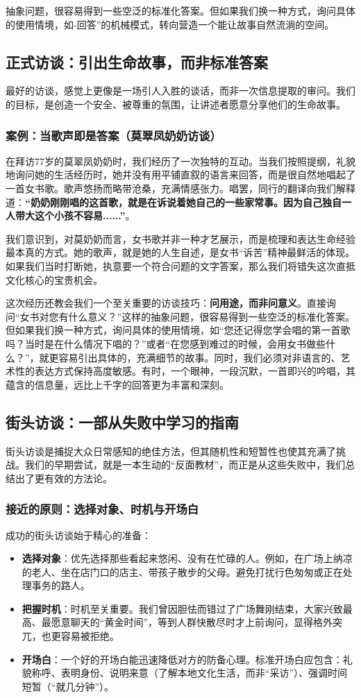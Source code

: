 \documentclass[UTF8]{ctexart}
\begin{document}
抽象问题，很容易得到一些空泛的标准化答案。但如果我们换一种方式，询问具体的使用情境，如-回答”的机械模式，转向营造一个能让故事自然流淌的空间。

\subsection{正式访谈：引出生命故事，而非标准答案}
最好的访谈，感觉上更像是一场引人入胜的谈话，而非一次信息提取的审问。我们的目标，是创造一个安全、被尊重的氛围，让讲述者愿意分享他们的生命故事。

\subsubsection{案例：当歌声即是答案（莫翠凤奶奶访谈）}
在拜访77岁的莫翠凤奶奶时，我们经历了一次独特的互动。当我们按照提纲，礼貌地询问她的生活经历时，她并没有用平铺直叙的语言来回答，而是很自然地唱起了一首女书歌。歌声悠扬而略带沧桑，充满情感张力。唱罢，同行的翻译向我们解释道：\textbf{“奶奶刚刚唱的这首歌，就是在诉说着她自己的一些家常事。因为自己独自一人带大这个小孩不容易......”}。

我们意识到，对莫奶奶而言，女书歌并非一种才艺展示，而是梳理和表达生命经验最本真的方式。她的歌声，就是她的人生自述，是女书“诉苦”精神最鲜活的体现。如果我们当时打断她，执意要一个符合问题的文字答案，那么我们将错失这次直抵文化核心的宝贵机会。

这次经历还教会我们一个至关重要的访谈技巧：\textbf{问用途，而非问意义}。直接询问“女书对您有什么意义？”这样的抽象问题，很容易得到一些空泛的标准化答案。但如果我们换一种方式，询问具体的使用情境，如“您还记得您学会唱的第一首歌吗？当时是在什么情况下唱的？”或者“在您感到难过的时候，会用女书做些什么？”，就更容易引出具体的，充满细节的故事。同时，我们必须对非语言的、艺术性的表达方式保持高度敏感。有时，一个眼神，一段沉默，一首即兴的吟唱，其蕴含的信息量，远比上千字的回答更为丰富和深刻。

\subsection{街头访谈：一部从失败中学习的指南}
街头访谈是捕捉大众日常感知的绝佳方法，但其随机性和短暂性也使其充满了挑战。我们的早期尝试，就是一本生动的“反面教材”，而正是从这些失败中，我们总结出了更有效的方法论。

\subsubsection{接近的原则：选择对象、时机与开场白}
成功的街头访谈始于精心的准备：
\begin{itemize}
    \item \textbf{选择对象}：优先选择那些看起来悠闲、没有在忙碌的人。例如，在广场上纳凉的老人、坐在店门口的店主、带孩子散步的父母。避免打扰行色匆匆或正在处理事务的路人。
    \item \textbf{把握时机}：时机至关重要。我们曾因胆怯而错过了广场舞刚结束，大家兴致最高、最愿意聊天的“黄金时间”，等到人群快散尽时才上前询问，显得格外突兀，也更容易被拒绝。
    \item \textbf{开场白}：一个好的开场白能迅速降低对方的防备心理。标准开场白应包含：礼貌称呼、表明身份、说明来意（了解本地文化生活，而非“采访”）、强调时间短暂（“就几分钟”）。
\end{itemize}
\end{document}
